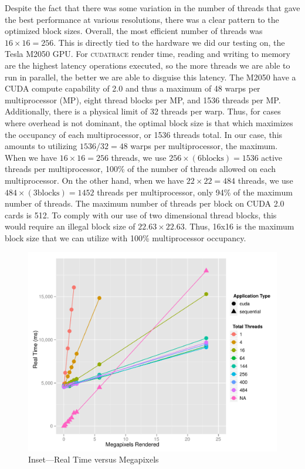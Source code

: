 \documentclass[12pt]{article}
\begin{document}
Despite the fact that there was some variation in the number of threads that gave the best performance at various resolutions, there was a clear pattern to the optimized block sizes. Overall, the most efficient number of threads was $16 \times 16 = 256$. This is directly tied to the hardware we did our testing on, the Tesla M2050 GPU. For \textsc{cudatrace} render time, reading and writing to memory are the highest latency operations executed, so the more threads we are able to run in parallel, the better we are able to disguise this latency. The M2050 have a CUDA compute capability of 2.0 and thus a maximum of 48 warps per multiprocessor (MP), eight thread blocks per MP, and 1536 threads per MP. Additionally, there is a physical limit of 32 threads per warp. Thus, for cases where overhead is not dominant, the optimal block size is that which maximizes the occupancy of each multiprocessor, or 1536 threads total.  In our case, this amounts to utilizing $1536/32 = 48$ warps per multiprocessor, the maximum. When we have $16 \times 16 = 256$ threads, we use $256 \times (6 \text{blocks}) = 1536$ active threads per multiprocessor, 100\% of the number of threads allowed on each multiprocessor. On the other hand, when we have $22 \times 22 = 484$ threads, we use $484 \times (3 \text{blocks}) = 1452$ threads per multiprocessor, only 94\% of the maximum number of threads. The maximum number of threads per block on CUDA 2.0 cards is 512. To comply with our use of two dimensional thread blocks, this would require an illegal block size of $22.63 \times 22.63$. Thus, 16x16 is the maximum block size that we can utilize with 100\% multiprocessor occupancy.

\begin{figure}
    \caption{Inset---Real Time versus Megapixels} \label{fig:real_time_zoom3}
    \begin{center}
\includegraphics{cudatrace-008}
    \end{center}
\end{figure}
\end{document}
